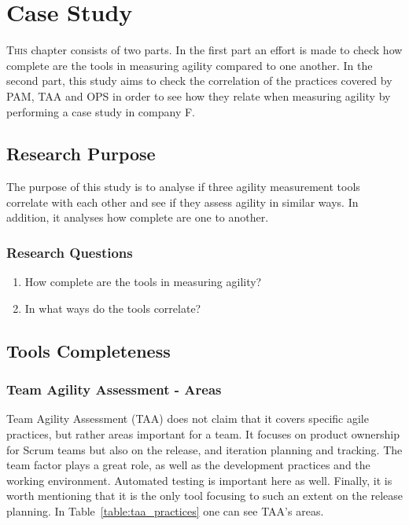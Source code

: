\chapter{Case Study}
\label{ch:case_study}


\lettrine[lines=4, loversize=-0.1, lraise=0.1]{T}{his} chapter consists of two parts. In the first part an effort is made to check how complete are the tools in measuring agility compared to one another. In the second part, this study aims to check the correlation of the practices covered by \ac{PAM}, \ac{TAA} and \ac{OPS} in order to see how they relate when measuring agility by performing a case study in company F.

\section{Research Purpose}
The purpose of this study is to analyse if three agility measurement tools correlate with each other and see if they assess agility in similar ways. In addition, it analyses how complete are one to another.


\subsection{Research Questions}
\begin{enumerate}
	\item How complete are the tools in measuring agility?
	\item In what ways do the tools correlate?
	\setcounter{tmpc}{\theenumi} %
\end{enumerate}



\section{Tools Completeness}
\label{sec:tools_completeness}

\subsection[\ac{TAA} Areas]{Team Agility Assessment - Areas}
Team Agility Assessment (\ac{TAA}) does not claim that it covers specific agile practices, but rather areas important for a team. It focuses on product ownership for Scrum teams but also on the release, and iteration planning and tracking. The team factor plays a great role, as well as the development practices and the working environment. Automated testing is important here as well. Finally, it is worth mentioning that it is the only tool focusing to such an extent on the release planning. In Table~\ref{table:taa_practices} one can see \ac{TAA}'s areas.

